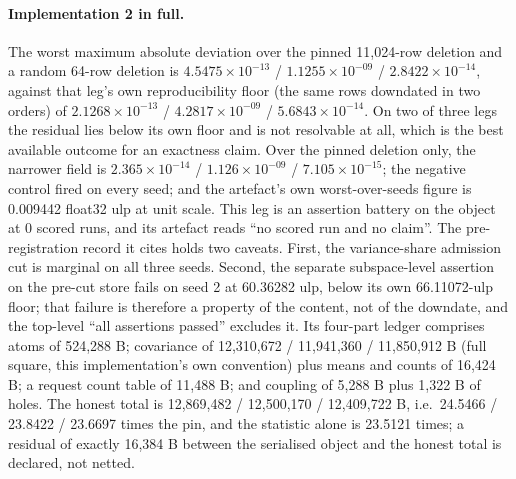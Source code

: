 \documentclass{article} %
\newcommand{\sci}[2]{\ensuremath{#1\times10^{#2}}}
\begin{document}
\paragraph{Implementation 2 in full.} The worst maximum absolute deviation over the pinned
11,024-row deletion and a random 64-row deletion is \sci{4.5475}{-13} / \sci{1.1255}{-09} /
\sci{2.8422}{-14}, against that leg's own reproducibility floor (the same rows downdated in two
orders) of \sci{2.1268}{-13} / \sci{4.2817}{-09} / \sci{5.6843}{-14}. On two of three legs the
residual lies below its own floor and is not resolvable at all, which is the best available outcome
for an exactness claim. Over the pinned deletion only, the narrower field is \sci{2.365}{-14} /
\sci{1.126}{-09} / \sci{7.105}{-15}; the negative control fired on every seed; and the artefact's
own worst-over-seeds figure is 0.009442 float32 ulp at unit scale. %
This leg is an assertion battery on the object at 0 scored runs, and its artefact reads ``no
scored run and no claim''. The pre-registration record it cites holds two caveats. First, the variance-share
admission cut is marginal on all three seeds. Second, the separate subspace-level assertion on the
pre-cut store fails on seed 2 at 60.36282 ulp, below its own 66.11072-ulp floor; that failure is
therefore a property of the content, not of the downdate, and the top-level ``all assertions
passed'' excludes it. %
Its four-part ledger comprises atoms of 524,288 B; covariance of 12,310,672 / 11,941,360 /
11,850,912 B (full square, this implementation's own convention) plus means and counts of 16,424
B; a request count table of 11,488 B; and coupling of 5,288 B plus 1,322 B of holes. The honest
total is 12,869,482 / 12,500,170 / 12,409,722 B, i.e.\ 24.5466 / 23.8422 / 23.6697 times the pin,
and the statistic alone is 23.5121 times; a residual of exactly 16,384 B between the serialised %
object and the honest total is declared, not netted. %
\end{document}
